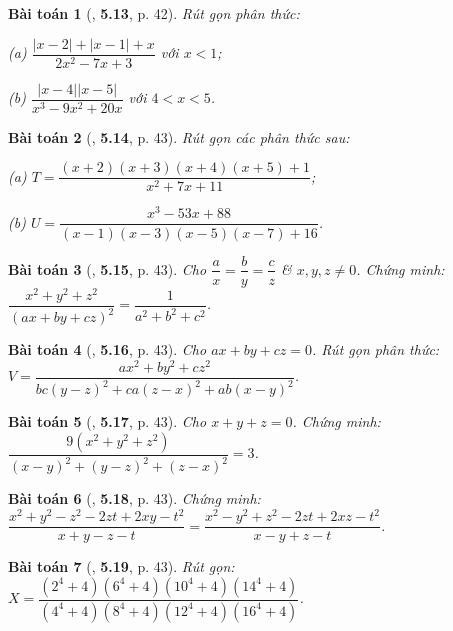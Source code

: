 \documentclass{article}
\numberwithin{equation}{section}
\newtheorem{baitoan}{Bài toán}[section]
\begin{document}
\begin{baitoan}[\cite{Binh_Nam_Ngoc_Son_Toan_8_Dai_So}, \textbf{5.13}, p. 42]
	Rút gọn phân thức:
	\begin{enumerate*}
		\item[(a)] $\dfrac{|x - 2| + |x - 1| + x}{2x^2 - 7x + 3}$ với $x < 1$;
		\item[(b)] $\dfrac{|x - 4||x - 5|}{x^3 - 9x^2 + 20x}$ với $4 < x < 5$.
	\end{enumerate*}
\end{baitoan}

\begin{baitoan}[\cite{Binh_Nam_Ngoc_Son_Toan_8_Dai_So}, \textbf{5.14}, p. 43]
	Rút gọn các phân thức sau:
	\begin{enumerate*}
		\item[(a)] $T = \dfrac{(x + 2)(x + 3)(x + 4)(x + 5) + 1}{x^2 + 7x + 11}$;
		\item[(b)] $U = \dfrac{x^3 - 53x + 88}{(x - 1)(x - 3)(x - 5)(x - 7) + 16}$.
	\end{enumerate*}
\end{baitoan}

\begin{baitoan}[\cite{Binh_Nam_Ngoc_Son_Toan_8_Dai_So}, \textbf{5.15}, p. 43]
	Cho $\dfrac{a}{x} = \dfrac{b}{y} = \dfrac{c}{z}$ \& $x,y,z\ne 0$. Chứng minh: $\dfrac{x^2 + y^2 + z^2}{(ax + by + cz)^2} = \dfrac{1}{a^2 + b^2 + c^2}$.
\end{baitoan}

\begin{baitoan}[\cite{Binh_Nam_Ngoc_Son_Toan_8_Dai_So}, \textbf{5.16}, p. 43]
	Cho $ax + by + cz = 0$. Rút gọn phân thức: $V = \dfrac{ax^2 + by^2 + cz^2}{bc(y - z)^2 + ca(z - x)^2 + ab(x - y)^2}$.
\end{baitoan}

\begin{baitoan}[\cite{Binh_Nam_Ngoc_Son_Toan_8_Dai_So}, \textbf{5.17}, p. 43]
	Cho $x + y + z = 0$. Chứng minh: $\dfrac{9(x^2 + y^2 + z^2)}{(x - y)^2 + (y - z)^2 + (z - x)^2} = 3$.
\end{baitoan}

\begin{baitoan}[\cite{Binh_Nam_Ngoc_Son_Toan_8_Dai_So}, \textbf{5.18}, p. 43]
	Chứng minh: $\dfrac{x^2 + y^2 - z^2 - 2zt + 2xy - t^2}{x + y - z - t} = \dfrac{x^2 - y^2 + z^2 - 2zt + 2xz - t^2}{x - y + z - t}$.
\end{baitoan}

\begin{baitoan}[\cite{Binh_Nam_Ngoc_Son_Toan_8_Dai_So}, \textbf{5.19}, p. 43]
	Rút gọn: $X = \dfrac{(2^4 + 4)(6^4 + 4)(10^4 + 4)(14^4 + 4)}{(4^4 + 4)(8^4 + 4)(12^4 + 4)(16^4 + 4)}$.
\end{baitoan}
\end{document}
